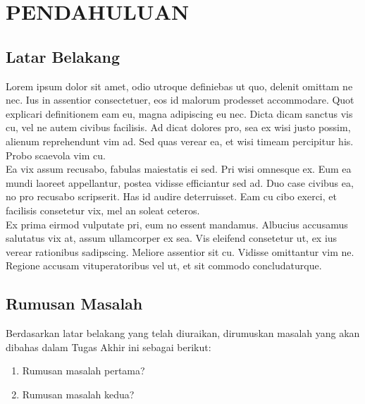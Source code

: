 \chapter{PENDAHULUAN}
\vspace{1.0cm}

\section{Latar Belakang}

Lorem ipsum dolor sit amet, odio utroque definiebas ut quo, delenit omittam ne nec. Ius in assentior consectetuer, eos id malorum prodesset accommodare. Quot explicari definitionem eam eu, magna adipiscing eu nec. Dicta dicam sanctus vis cu, vel ne autem civibus facilisis. Ad dicat dolores pro, sea ex wisi justo possim, alienum reprehendunt vim ad. Sed quas verear ea, et wisi timeam percipitur his. Probo scaevola vim cu.\\

Ea vix assum recusabo, fabulas maiestatis ei sed. Pri wisi omnesque ex. Eum ea mundi laoreet appellantur, postea vidisse efficiantur sed ad. Duo case civibus ea, no pro recusabo scripserit. Has id audire deterruisset. Eam cu cibo exerci, et facilisis consetetur vix, mel an soleat ceteros.\\

Ex prima eirmod vulputate pri, eum no essent mandamus. Albucius accusamus salutatus vix at, assum ullamcorper ex sea. Vis eleifend consetetur ut, ex ius verear rationibus sadipscing. Meliore assentior sit cu. Vidisse omittantur vim ne. Regione accusam vituperatoribus vel ut, et sit commodo concludaturque.\\

\section{Rumusan Masalah}
Berdasarkan latar belakang yang telah diuraikan, dirumuskan masalah yang akan dibahas dalam Tugas Akhir ini sebagai berikut:
\begin{enumerate}
	\item Rumusan masalah pertama?
\pagebreak	
	\item Rumusan masalah kedua?
\end{enumerate}

